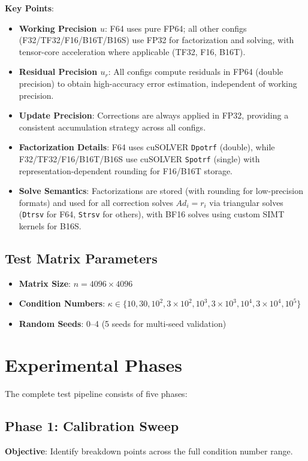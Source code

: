 \documentclass[11pt,a4paper]{article}
\begin{document}
\textbf{Key Points}:
\begin{itemize}
  \item \textbf{Working Precision $u$}: F64 uses pure FP64; all other configs (F32/TF32/F16/B16T/B16S) use FP32 for factorization and solving, with tensor-core acceleration where applicable (TF32, F16, B16T).
  \item \textbf{Residual Precision $u_r$}: All configs compute residuals in FP64 (double precision) to obtain high-accuracy error estimation, independent of working precision.
  \item \textbf{Update Precision}: Corrections are always applied in FP32, providing a consistent accumulation strategy across all configs.
  \item \textbf{Factorization Details}: F64 uses cuSOLVER \texttt{Dpotrf} (double), while F32/TF32/F16/B16T/B16S use cuSOLVER \texttt{Spotrf} (single) with representation-dependent rounding for F16/B16T storage.
  \item \textbf{Solve Semantics}: Factorizations are stored (with rounding for low-precision formats) and used for all correction solves $Ad_i = r_i$ via triangular solves (\texttt{Dtrsv} for F64, \texttt{Strsv} for others), with BF16 solves using custom SIMT kernels for B16S.
\end{itemize}

\subsection{Test Matrix Parameters}
\begin{itemize}
  \item \textbf{Matrix Size}: $n = 4096 \times 4096$
  \item \textbf{Condition Numbers}: $\kappa \in \{10, 30, 10^2, 3 \times 10^2, 10^3, 3 \times 10^3, 10^4, 3 \times 10^4, 10^5\}$
  \item \textbf{Random Seeds}: 0--4 (5 seeds for multi-seed validation)
\end{itemize}

\section{Experimental Phases}

The complete test pipeline consists of five phases:

\subsection{Phase 1: Calibration Sweep}
\textbf{Objective}: Identify breakdown points across the full condition number range.
\end{document}
